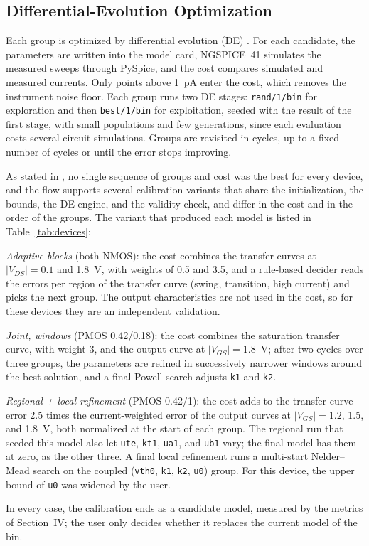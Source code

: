 \documentclass[a4paper,10pt,twoside,twocolumn,final]{JICS_LaTexGuidelines} %
\newenvironment{compactitem}{%
	\begin{list}{\textbullet}{%
		\setlength{\leftmargin}{1.2em}\setlength{\labelwidth}{0.7em}\setlength{\labelsep}{0.5em}%
		\setlength{\itemsep}{1pt}\setlength{\parsep}{0pt}\setlength{\topsep}{3pt}\setlength{\partopsep}{0pt}}}%
	{\end{list}}
\begin{document}
\subsection{Differential-Evolution Optimization}

Each group is optimized by differential evolution (DE) \cite{b24}. For each candidate, the parameters are written into the model card, NGSPICE~41 simulates the measured sweeps through PySpice, and the cost compares simulated and measured currents. Only points above 1~pA enter the cost, which removes the instrument noise floor. Each group runs two DE stages: \texttt{rand/1/bin} for exploration and then \texttt{best/1/bin} for exploitation, seeded with the result of the first stage, with small populations and few generations, since each evaluation costs several circuit simulations. Groups are revisited in cycles, up to a fixed number of cycles or until the error stops improving.

As stated in \cite{b17}, no single sequence of groups and cost was the best for every device, and the flow supports several calibration variants that share the initialization, the bounds, the DE engine, and the validity check, and differ in the cost and in the order of the groups. The variant that produced each model is listed in Table~\ref{tab:devices}:
\begin{compactitem}
	\item \emph{Adaptive blocks} (both NMOS): the cost combines the transfer curves at $|V_{DS}|=0.1$ and 1.8~V, with weights of 0.5 and 3.5, and a rule-based decider reads the errors per region of the transfer curve (swing, transition, high current) and picks the next group. The output characteristics are not used in the cost, so for these devices they are an independent validation.
	\item \emph{Joint, windows} (PMOS 0.42/0.18): the cost combines the saturation transfer curve, with weight 3, and the output curve at $|V_{GS}|=1.8$~V; after two cycles over three groups, the parameters are refined in successively narrower windows around the best solution, and a final Powell search adjusts \texttt{k1} and \texttt{k2}.
	\item \emph{Regional + local refinement} (PMOS 0.42/1): the cost adds to the transfer-curve error 2.5 times the current-weighted error of the output curves at $|V_{GS}|=1.2$, 1.5, and 1.8~V, both normalized at the start of each group. The regional run that seeded this model also let \texttt{ute}, \texttt{kt1}, \texttt{ua1}, and \texttt{ub1} vary; the final model has them at zero, as the other three. A final local refinement runs a multi-start Nelder--Mead search on the coupled (\texttt{vth0}, \texttt{k1}, \texttt{k2}, \texttt{u0}) group. For this device, the upper bound of \texttt{u0} was widened by the user.
\end{compactitem}
In every case, the calibration ends as a candidate model, measured by the metrics of Section~IV; the user only decides whether it replaces the current model of the bin.
\end{document}
